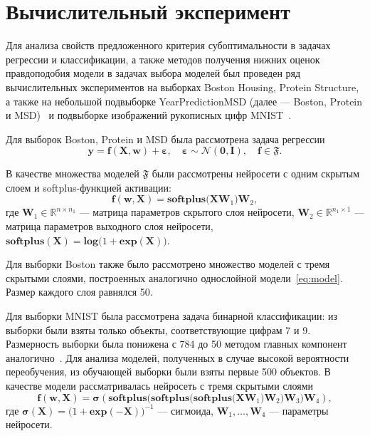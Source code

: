 \documentclass[12pt]{a&t}
\begin{document}
\section{Вычислительный эксперимент}
Для анализа свойств предложенного критерия субоптимальности в задачах регрессии и классификации, а также методов получения нижних оценок правдоподобия модели в задачах выбора моделей был проведен ряд вычислительных экспериментов на выборках Boston Housing, Protein Structure, а также на небольшой подвыборке YearPredictionMSD (далее --- Boston, Protein и MSD)~\cite{UCI} {и подвыборке изображений рукописных цифр MNIST~\cite{mnist}}.

{Для выборок Boston, Protein и MSD} была рассмотрена задача регрессии
\[
	\mathbf{y} = \mathbf{f}(\mathbf{X}, \mathbf{w}) + \boldsymbol{\varepsilon}, \quad  \boldsymbol{\varepsilon} \sim \mathcal{N}(\mathbf{0}, \mathbf{I}), \quad \mathbf{f} \in \mathfrak{F}.
\]

В качестве множества моделей $\mathfrak{F}$ были рассмотрены  нейросети с одним скрытым слоем и softplus-функцией активации:
\begin{equation}
\label{eq:model}
	\mathbf{f}(\mathbf{w}, \mathbf{X}) =   \textbf{softplus}\bigl(\mathbf{X} \mathbf{W}_1 \bigr)  \mathbf{W}_2,
\end{equation}
где $\mathbf{W}_1 \in \mathbb{R}^{n\times n_1}$ --- матрица параметров скрытого слоя нейросети, $\mathbf{W}_2 \in \mathbb{R}^{n_1\times 1}$ --- матрица параметров выходного слоя нейросети, {$\textbf{softplus}(\mathbf{X}) = \textbf{log}\bigl(1+\textbf{exp}(\mathbf{X})\bigr)$}.

{Для выборки Boston также было рассмотрено множество моделей с тремя скрытыми слоями, построенных аналогично однослойной модели~\eqref{eq:model}. Размер каждого слоя равнялся 50.}

{Для выборки MNIST была рассмотрена задача бинарной классификации: из выборки были взяты только объекты, соответствующие цифрам 7 и 9. Размерность выборки была понижена с 784 до 50 методом главных компонент аналогично~\cite{firefly}. Для анализа моделей, полученных в случае высокой вероятности переобучения, из обучающей выборки были взяты первые 500 объектов. В качестве модели рассматривалась нейросеть с тремя скрытыми слоями}
\[
    \mathbf{f}(\mathbf{w}, \mathbf{X}) =   \boldsymbol{\sigma}(\textbf{softplus}\bigl(  \textbf{softplus} \bigl(\textbf{softplus}\bigl(\mathbf{X} \mathbf{W}_1 \bigr)  \mathbf{W}_2 \bigr) \mathbf{W}_3 \bigr) \mathbf{W}_4),
\]
{где $\boldsymbol{\sigma}(\mathbf{X}) = \bigl(1+\textbf{exp}(\mathbf{-X})\bigr)^{-1}$  --- сигмоида, $\mathbf{W}_1, \dots, \mathbf{W}_4$ --- параметры нейросети.}
\end{document}

